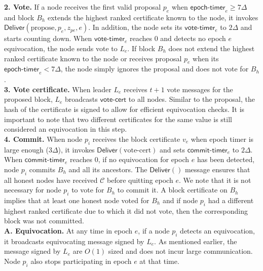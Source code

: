 \documentclass[11pt]{article}
\theoremstyle{definition}
\theoremstyle{remark}
\begin{document}
\textbf{2. Vote.} If a node receives the first valid proposal $p_e$ when $\mathsf{epoch\mbox{-}timer}_e \geq 7 \Delta$ and block $B_h$ extends the highest ranked certificate known to the node, it invokes $\mathsf{Deliver}(\text{propose}, p_e, z_{pe}, e)$. In addition, the node sets its $\mathsf{vote\mbox{-}timer}_e$ to $2 \Delta$ and starts counting down. When $\mathsf{vote\mbox{-}timer}_e$ reaches 0 and detects no epoch $e$ equivocation, the node sends vote to $L_e$. If block $B_h$ does not extend the highest ranked certificate known to the node or receives proposal $p_e$ when its $\mathsf{epoch\mbox{-}timer}_e < 7 \Delta$, the node simply ignores the proposal and does not vote for $B_h$.\\

\textbf{3. Vote certificate.} When leader $L_e$ receives $t + 1$ vote messages for the proposed block, $L_e$ broadcasts $\mathsf{vote\mbox{-}cert}$ to all nodes. Similar to the proposal, the hash of the certificate is signed to allow for efficient equivocation checks. It is important to note that two different certificates for the same value is still considered an equivocation in this step.\\

\textbf{4. Commit.} When node $p_i$ receives the block certificate $v_e$ when epoch timer is large enough ($3 \Delta$), it invokes $\mathsf{Deliver}(\text{vote-cert})$ and sets $\mathsf{commit\mbox{-}timer}_e$ to $2 \Delta$. When $\mathsf{commit\mbox{-}timer}_e$ reaches 0, if no equivocation for epoch $e$ has been detected, node $p_i$ commits $B_h$ and all its ancestors. The $\mathsf{Deliver}()$ message ensures that all honest nodes have received $\mathcal{C}$ before quitting epoch $e$. We note that it is not necessary for node $p_i$ to vote for $B_h$ to commit it. A block certificate on $B_h$ implies that at least one honest node voted for $B_h$ and if node $p_i$ had a different highest ranked certificate due to which it did not vote, then the corresponding block was not committed.\\

\textbf{A. Equivocation.} At any time in epoch $e$, if a node $p_i$ detects an equivocation, it broadcasts equivocating message signed by $L_e$. As mentioned earlier, the message signed by $L_e$ are $O(1)$ sized and does not incur large communication. Node $p_i$ also stops participating in epoch $e$ at that time.\\
\end{document}
